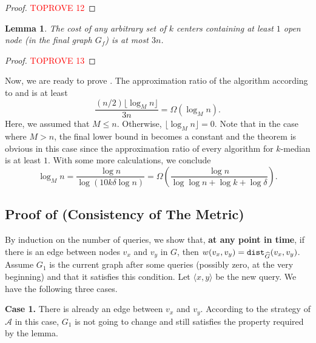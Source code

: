 \documentclass[11pt]{article}
\newcommand{\1}{\mathmybb{1}}
\newtheorem{lemma}[theorem]{Lemma}
\newcommand{\dist}{\textnormal{\texttt{dist}}}
\newcommand{\adv}[0]{\mathcal{A}}
\begin{document}
\begin{proof}\textcolor{red}{TOPROVE 12}\end{proof}


\begin{lemma}\label{lem:upper-bound-on-optimum-k-median}
    The cost of any arbitrary set of $k$ centers containing at least $1$ open node (in the final graph $G_f$) is at most $3n$.
\end{lemma}

\begin{proof}\textcolor{red}{TOPROVE 13}\end{proof}

\noindent
Now, we are ready to prove .
The approximation ratio of the algorithm according to  and  is at least
$$ \frac{(n/2) \lfloor \log_M n \rfloor}{3n} = \Omega(\log_M n). $$
Here, we assumed that $M \leq n$.
Otherwise, $\lfloor \log_M n \rfloor = 0$. Note that in the case where $M > n$, the final lower bound in  becomes a constant and the theorem is obvious in this case since the approximation ratio of every algorithm for $k$-median is at least $1$.
With some more calculations, we conclude 
$$\log_M n =\frac{\log n}{ \log \left( 10k\delta\log n\right)}  = \Omega \left(\frac{\log n}{ \log \log n + \log k + \log \delta} \right). $$







\subsection{Proof of  (Consistency of The Metric)}\label{sec:consistency-proof}

    By induction on the number of queries, we show that, \textbf{at any point in time}, if there is an edge between nodes $v_x$ and $v_y$ in $G$, then 
    $w(v_x,v_y) = \dist_{\widehat G}(v_x,v_y)$.
    Assume $G_1$ is the current graph after some queries (possibly zero, at the very beginning) and that it satisfies this condition.
    Let $\langle x,y \rangle$ be the new query.
    We have the following three cases.

    \medskip
    \noindent \textbf{Case 1.}
    There is already an edge between $v_x$ and $v_y$.
    According to the strategy of $\adv$ in this case, $G_1$ is not going to change and still satisfies the property required by the lemma.
\end{document}
